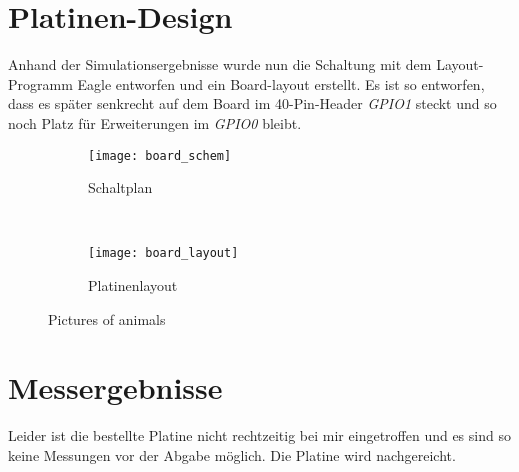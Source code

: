 \section{Platinen-Design}
Anhand der Simulationsergebnisse wurde nun die Schaltung mit dem Layout-Programm Eagle entworfen und ein Board-layout erstellt. Es ist so entworfen, dass es später senkrecht auf dem Board im 40-Pin-Header \emph{GPIO1} steckt und so noch Platz für Erweiterungen im \emph{GPIO0} bleibt.

\begin{figure}[h!]
        \centering
        \begin{subfigure}[b]{0.5\textwidth}
                \centering
                \texttt{[image: board\_schem]}
                \caption{Schaltplan}
                \label{fig:schem}
        \end{subfigure}~\begin{subfigure}[b]{0.4\textwidth}
                \centering
                \texttt{[image: board\_layout]}
                \caption{Platinenlayout}
                \label{fig:layout}
        \end{subfigure} 
        \caption{Pictures of animals}\label{fig:board}
\end{figure}

\section{Messergebnisse}
Leider ist die bestellte Platine nicht rechtzeitig bei mir eingetroffen und es sind so keine Messungen vor der Abgabe möglich. Die Platine wird nachgereicht.

